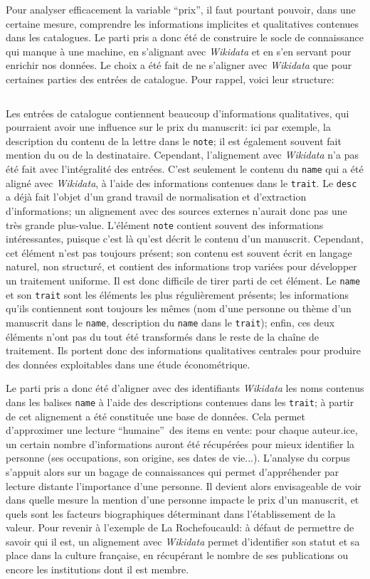 \documentclass[a4paper, 12pt, twoside]{book}
\newcommand{\tname}{\texttt{name}}
\newcommand{\ttrait}{\texttt{trait}}
\newcommand{\tdesc}{\texttt{desc}}
\newcommand{\tnote}{\texttt{note}}
\newcommand{\wkd}{\textit{Wikidata}}
\begin{document}
Pour analyser efficacement la variable \enquote{prix}, il faut pourtant pouvoir, dans une certaine mesure, comprendre les informations implicites et qualitatives contenues dans les catalogues. Le parti pris a donc été de construire le socle de connaissance qui manque à une machine, en s'alignant avec \wkd{} et en s'en servant pour enrichir nos données. Le choix a été fait de ne s'aligner avec \wkd{} que pour certaines parties des entrées de catalogue. Pour rappel, voici leur structure:

\inputminted[linenos, breaklines, tabsize=4]{xml}{code/tei_item.xml}

Les entrées de catalogue contiennent beaucoup d'informations qualitatives, qui pourraient avoir une influence sur le prix du manuscrit: ici par exemple, la description du contenu de la lettre dans le \tnote{}; il est également souvent fait mention du ou de la destinataire. Cependant, l'alignement avec \wkd{} n'a pas été fait avec l'intégralité des entrées. C'est seulement le contenu du \tname{} qui a été aligné avec \wkd{}, à l'aide des informations contenues dans le \ttrait{}. Le \tdesc{} a déjà fait l'objet d'un grand travail de normalisation et d'extraction d'informations; un alignement avec des sources externes n'aurait donc pas une très grande plus-value. L'élément \tnote{} contient souvent des informations intéressantes, puisque c'est là qu'est décrit le contenu d'un manuscrit. Cependant, cet élément n'est pas toujours présent; son contenu est souvent écrit en langage naturel, non structuré, et contient des informations trop variées pour développer un traitement uniforme. Il est donc difficile de tirer parti de cet élément. Le \tname{} et son \ttrait{} sont les éléments les plus régulièrement présents; les informations qu'ils contiennent sont toujours les mêmes (nom d'une personne ou thème d'un manuscrit dans le \tname{}, description du \tname{} dans le \ttrait{}); enfin, ces deux éléments n'ont pas du tout été transformés dans le reste de la chaîne de traitement. Ils portent donc des informations qualitatives centrales pour produire des données exploitables dans une étude économétrique.

Le parti pris a donc été d'aligner avec des identifiants \wkd{} les noms contenus dans les balises \tname{} à l'aide des descriptions contenues dans les \ttrait{}; à partir de cet alignement a été constituée une base de données. Cela permet d'approximer une lecture \enquote{humaine} des items en vente: pour chaque auteur.ice, un certain nombre d'informations auront été récupérées pour mieux identifier la personne (ses occupations, son origine, ses dates de vie...). L'analyse du corpus s'appuit alors sur un bagage de connaissances qui permet d'appréhender par lecture distante l'importance d'une personne. Il devient alors envisageable de voir dans quelle mesure la mention d'une personne impacte le prix d'un manuscrit, et quels sont les facteurs biographiques déterminant dans l'établissement de la valeur. Pour revenir à l'exemple de La Rochefoucauld: à défaut de permettre de savoir qui il est, un alignement avec \wkd{} permet d'identifier son statut et sa place dans la culture française, en récupérant le nombre de ses publications ou encore les institutions dont il est membre.
\end{document}
